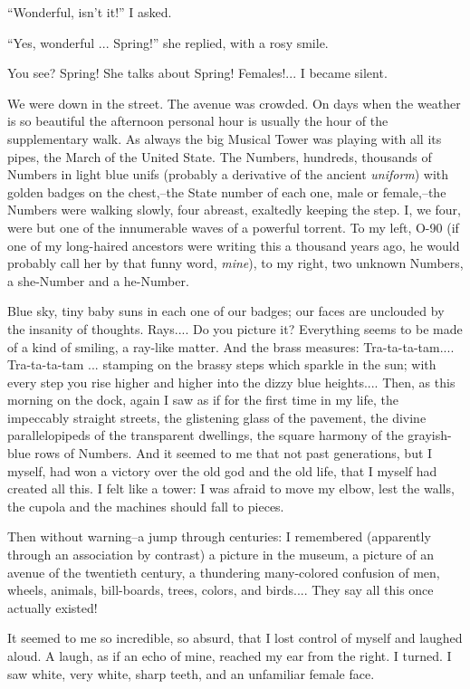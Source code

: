 \documentclass[11pt,openany]{book}
\begin{document}
``Wonderful, isn't it!'' I asked.

``Yes, wonderful ... Spring!'' she replied, with a rosy smile.

You see? Spring! She talks about Spring! Females!... I became silent.

We were down in the street. The avenue was crowded. On days when the weather is so beautiful the afternoon personal hour is usually the hour of the supplementary walk. As always the big Musical Tower was playing with all its pipes, the March of the United State. The Numbers, hundreds, thousands of Numbers in light blue unifs (probably a derivative of the ancient \emph{uniform}) with golden badges on the chest,--the State number of each one, male or female,--the Numbers were walking slowly, four abreast, exaltedly keeping the step. I, we four, were but one of the innumerable waves of a powerful torrent. To my left, O-90 (if one of my long-haired ancestors were writing this a thousand years ago, he would probably call her by that funny word, \emph{mine}), to my right, two unknown Numbers, a she-Number and a he-Number.

Blue sky, tiny baby suns in each one of our badges; our faces are unclouded by the insanity of thoughts. Rays.... Do you picture it? Everything seems to be made of a kind of smiling, a ray-like matter. And the brass measures: Tra-ta-ta-tam.... Tra-ta-ta-tam ... stamping on the brassy steps which sparkle in the sun; with every step you rise higher and higher into the dizzy blue heights.... Then, as this morning on the dock, again I saw as if for the first time in my life, the impeccably straight streets, the glistening glass of the pavement, the divine parallelopipeds of the transparent dwellings, the square harmony of the grayish-blue rows of Numbers. And it seemed to me that not past generations, but I myself, had won a victory over the old god and the old life, that I myself had created all this. I felt like a tower: I was afraid to move my elbow, lest the walls, the cupola and the machines should fall to pieces.

Then without warning--a jump through centuries: I remembered (apparently through an association by contrast) a picture in the museum, a picture of an avenue of the twentieth century, a thundering many-colored confusion of men, wheels, animals, bill-boards, trees, colors, and birds.... They say all this once actually existed!

It seemed to me so incredible, so absurd, that I lost control of myself and laughed aloud. A laugh, as if an echo of mine, reached my ear from the right. I turned. I saw white, very white, sharp teeth, and an unfamiliar female face.
\end{document}
